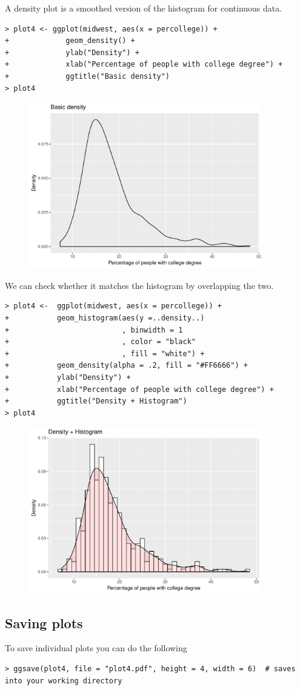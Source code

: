 A density plot is a smoothed version of the histogram for continuous data.

\begin{lstlisting}
> plot4 <- ggplot(midwest, aes(x = percollege)) + 
+             geom_density() +
+             ylab("Density") +
+             xlab("Percentage of people with college degree") +
+             ggtitle("Basic density")
> plot4
\end{lstlisting}

\begin{figure}[h]
\centering
\includegraphics[width=4in]{plots/11.pdf} 
\end{figure}

We can check whether it matches the histogram by overlapping the two.

\begin{lstlisting}
> plot4 <-  ggplot(midwest, aes(x = percollege)) +
+           geom_histogram(aes(y =..density..)
+                          , binwidth = 1
+                          , color = "black"
+                          , fill = "white") +
+           geom_density(alpha = .2, fill = "#FF6666") +
+           ylab("Density") +
+           xlab("Percentage of people with college degree") +
+           ggtitle("Density + Histogram")
> plot4
\end{lstlisting}

\begin{figure}[h]
\centering
\includegraphics[width=4in]{plots/12.pdf} 
\end{figure}

\subsection{Saving plots}

To save individual plots you can do the following

\begin{lstlisting}
> ggsave(plot4, file = "plot4.pdf", height = 4, width = 6)  # saves into your working directory
\end{lstlisting}


